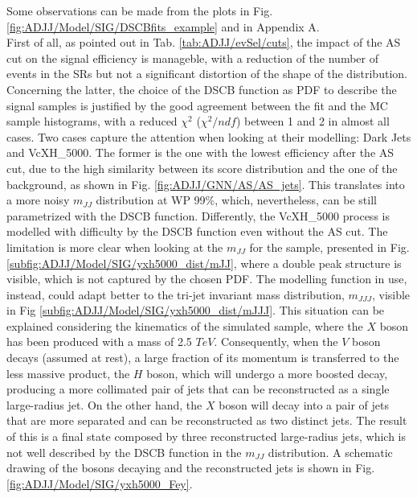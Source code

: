 \noindent Some observations can be made from the plots in Fig. \ref{fig:ADJJ/Model/SIG/DSCBfits_example} and in Appendix A.\\
First of all, as pointed out in Tab. \ref{tab:ADJJ/evSel/cuts}, the impact of the AS cut on the signal efficiency is manageble, with a reduction of the number of events in the SRs but not a significant distortion of the shape of the distribution.
Concerning the latter, the choice of the DSCB function as PDF to describe the signal samples is justified by the good agreement between the fit and the MC sample histograms, with a reduced $\chi^2$ ($\chi^2/ndf$) between 1 and 2 in almost all cases.
Two cases capture the attention when looking at their modelling: Dark Jets and VcXH\_5000.
The former is the one with the lowest efficiency after the AS cut, due to the high similarity between its score distribution and the one of the background, as shown in Fig. \ref{fig:ADJJ/GNN/AS/AS_jets}.
This translates into a more noisy $m_{JJ}$ distribution at WP 99\%, which, nevertheless, can be still parametrized with the DSCB function.
Differently, the VcXH\_5000 process is modelled with difficulty by the DSCB function even without the AS cut.
The limitation is more clear when looking at the $m_{JJ}$ for the sample, presented in Fig. \ref{subfig:ADJJ/Model/SIG/yxh5000_dist/mJJ}, where a double peak structure is visible, which is not captured by the chosen PDF.
The modelling function in use, instead, could adapt better to the tri-jet invariant mass distribution, $m_{JJJ}$, visible in Fig \ref{subfig:ADJJ/Model/SIG/yxh5000_dist/mJJJ}.
This situation can be explained considering the kinematics of the simulated sample, where the $X$ boson has been produced with a mass of 2.5 $TeV$.
Consequently, when the $V$ boson decays (assumed at rest), a large fraction of its momentum is transferred to the less massive product, the $H$ boson, which will undergo a more boosted decay, producing a more collimated pair of jets that can be reconstructed as a single large-radius jet.
On the other hand, the $X$ boson will decay into a pair of jets that are more separated and can be reconstructed as two distinct jets.
The result of this is a final state composed by three reconstructed large-radius jets, which is not well described by the DSCB function in the $m_{JJ}$ distribution.
A schematic drawing of the bosons decaying and the reconstructed jets is shown in Fig. \ref{fig:ADJJ/Model/SIG/yxh5000_Fey}.

